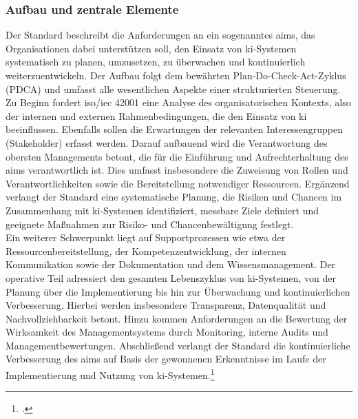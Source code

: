 \subsubsection{Aufbau und zentrale Elemente}
\label{subsubsec:iso_aufbau}
Der Standard beschreibt die Anforderungen an ein sogenanntes \ac{aims}, das Organisationen dabei unterstützen soll, den Einsatz von \ac{ki}-Systemen systematisch zu planen, umzusetzen, zu überwachen und kontinuierlich weiterzuentwickeln.
Der Aufbau folgt dem bewährten Plan-Do-Check-Act-Zyklus (PDCA) und umfasst alle wesentlichen Aspekte einer strukturierten Steuerung.
\\
Zu Beginn fordert \ac{iso}/\ac{iec} 42001 eine Analyse des organisatorischen Kontexts, also der internen und externen Rahmenbedingungen, die den Einsatz von \ac{ki} beeinflussen.
Ebenfalls sollen die Erwartungen der relevanten Interessengruppen (Stakeholder) erfasst werden.
Darauf aufbauend wird die Verantwortung des obersten Managements betont, die für die Einführung und Aufrechterhaltung des \ac{aims} verantwortlich ist.
Dies umfasst insbesondere die Zuweisung von Rollen und Verantwortlichkeiten sowie die Bereitstellung notwendiger Ressourcen.
Ergänzend verlangt der Standard eine systematische Planung, die Risiken und Chancen im Zusammenhang mit \ac{ki}-Systemen identifiziert, messbare Ziele definiert und geeignete Maßnahmen zur Risiko- und Chancenbewältigung festlegt.
\\
Ein weiterer Schwerpunkt liegt auf Supportprozessen wie etwa der Ressourcenbereitstellung, der Kompetenzentwicklung, der internen Kommunikation sowie der Dokumentation und dem Wissensmanagement.
Der operative Teil adressiert den gesamten Lebenszyklus von \ac{ki}-Systemen, von der Planung über die Implementierung bis hin zur Überwachung und kontinuierlichen Verbesserung.
Hierbei werden insbesondere Transparenz, Datenqualität und Nachvollziehbarkeit betont.
Hinzu kommen Anforderungen an die Bewertung der Wirksamkeit des Managementsystems durch Monitoring, interne Audits und Managementbewertungen.
Abschließend verlangt der Standard die kontinuierliche Verbesserung des \ac{aims} auf Basis der gewonnenen Erkenntnisse im Laufe der Implementierung und Nutzung von \ac{ki}-Systemen.\footcite[5-16]{isoISOIEC42001}

